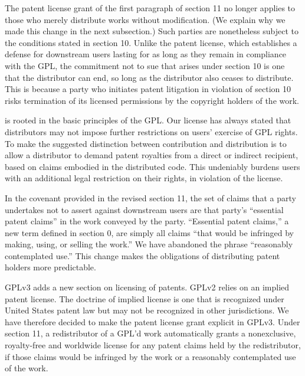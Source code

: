 The patent license grant of the first paragraph of section 11 no longer
applies to those who merely distribute works without modification. (We
explain why we made this change in the next subsection.) Such parties are
nonetheless subject to the conditions stated in section 10.  Unlike the
patent license, which establishes a defense for downstream users lasting for
as long as they remain in compliance with the GPL, the commitment not to sue
that arises under section 10 is one that the distributor can end, so long as
the distributor also ceases to distribute.  This is because a party who
initiates patent litigation in violation of section 10 risks termination of
its licensed permissions by the copyright holders of the work.


is rooted in the basic principles of the GPL.
Our license has always stated that distributors may not impose further
restrictions on users' exercise of GPL rights.  To make the suggested
distinction between contribution and distribution is to allow a
distributor to demand patent royalties from a direct or indirect
recipient, based on claims embodied in the distributed code. This
undeniably burdens users with an additional legal restriction on their
rights, in violation of the license.


In the covenant provided in the revised section 11, the set of claims
that a party undertakes not to assert against downstream users are that
party's ``essential patent claims'' in the work conveyed by the party.
``Essential patent claims,'' a new term defined in section 0, are simply
all claims ``that would be infringed by making, using, or selling the
work.''  We have abandoned the phrase ``reasonably contemplated use.''
This change makes the obligations of distributing patent holders more
predictable.


GPLv3 adds a new section on licensing of patents. GPLv2 relies on an implied
patent license. The doctrine of implied license is one that is recognized
under United States patent law but may not be recognized in other
jurisdictions. We have therefore decided to make the patent license grant
explicit in GPLv3. Under section 11, a redistributor of a GPL'd work
automatically grants a nonexclusive, royalty-free and worldwide license for
any patent claims held by the redistributor, if those claims would be
infringed by the work or a reasonably contemplated use of the work.

